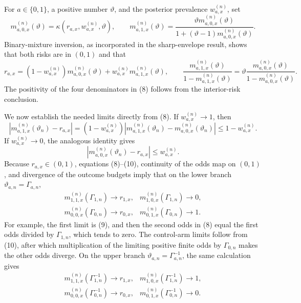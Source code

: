 For \(a\in\{0,1\}\), a positive number \(\vartheta\), and the posterior prevalence \(w_{a,x}^{(n)}\), set
\[
 m_{a,0,x}^{(n)}(\vartheta)
   =\kappa(r_{a,x},w_{a,x}^{(n)},\vartheta),
 \qquad
 m_{a,1,x}^{(n)}(\vartheta)
   =\frac{\vartheta m_{a,0,x}^{(n)}(\vartheta)}
          {1+(\vartheta-1)m_{a,0,x}^{(n)}(\vartheta)}.
 \tag{7}
\]
Binary-mixture inversion, as incorporated in the sharp-envelope result, shows that both risks are in \((0,1)\) and that
\[
 r_{a,x}=(1-w_{a,x}^{(n)})m_{a,0,x}^{(n)}(\vartheta)
          +w_{a,x}^{(n)}m_{a,1,x}^{(n)}(\vartheta),
 \qquad
 \frac{m_{a,1,x}^{(n)}(\vartheta)}
      {1-m_{a,1,x}^{(n)}(\vartheta)}
 =\vartheta
  \frac{m_{a,0,x}^{(n)}(\vartheta)}
       {1-m_{a,0,x}^{(n)}(\vartheta)}.
 \tag{8}
\]
The positivity of the four denominators in (8) follows from the interior-risk conclusion.

We now establish the needed limits directly from (8).  If \(w_{a,x}^{(n)}\to1\), then
\[
 \left|m_{a,1,x}^{(n)}(\vartheta_n)-r_{a,x}\right|
 =(1-w_{a,x}^{(n)})
  \left|m_{a,1,x}^{(n)}(\vartheta_n)
        -m_{a,0,x}^{(n)}(\vartheta_n)\right|
 \leq1-w_{a,x}^{(n)}.
 \tag{9}
\]
If \(w_{a,x}^{(n)}\to0\), the analogous identity gives
\[
 \left|m_{a,0,x}^{(n)}(\vartheta_n)-r_{a,x}\right|
 \leq w_{a,x}^{(n)}.
 \tag{10}
\]
Because \(r_{a,x}\in(0,1)\), equations (8)--(10), continuity of the odds map on \((0,1)\), and divergence of the outcome budgets imply that on the lower branch \(\vartheta_{a,n}=\Gamma_{a,n}\),
\[
\begin{array}{ll}
 m_{1,1,x}^{(n)}(\Gamma_{1,n})\longrightarrow r_{1,x},
 &m_{1,0,x}^{(n)}(\Gamma_{1,n})\longrightarrow0,\\
 m_{0,0,x}^{(n)}(\Gamma_{0,n})\longrightarrow r_{0,x},
 &m_{0,1,x}^{(n)}(\Gamma_{0,n})\longrightarrow1.
\end{array}
\tag{11}
\]
For example, the first limit is (9), and then the second odds in (8) equal the first odds divided by \(\Gamma_{1,n}\), which tends to zero.  The control-arm limits follow from (10), after which multiplication of the limiting positive finite odds by \(\Gamma_{0,n}\) makes the other odds diverge.  On the upper branch \(\vartheta_{a,n}=\Gamma_{a,n}^{-1}\), the same calculation gives
\[
\begin{array}{ll}
 m_{1,1,x}^{(n)}(\Gamma_{1,n}^{-1})\longrightarrow r_{1,x},
 &m_{1,0,x}^{(n)}(\Gamma_{1,n}^{-1})\longrightarrow1,\\
 m_{0,0,x}^{(n)}(\Gamma_{0,n}^{-1})\longrightarrow r_{0,x},
 &m_{0,1,x}^{(n)}(\Gamma_{0,n}^{-1})\longrightarrow0.
\end{array}
\tag{12}
\]

